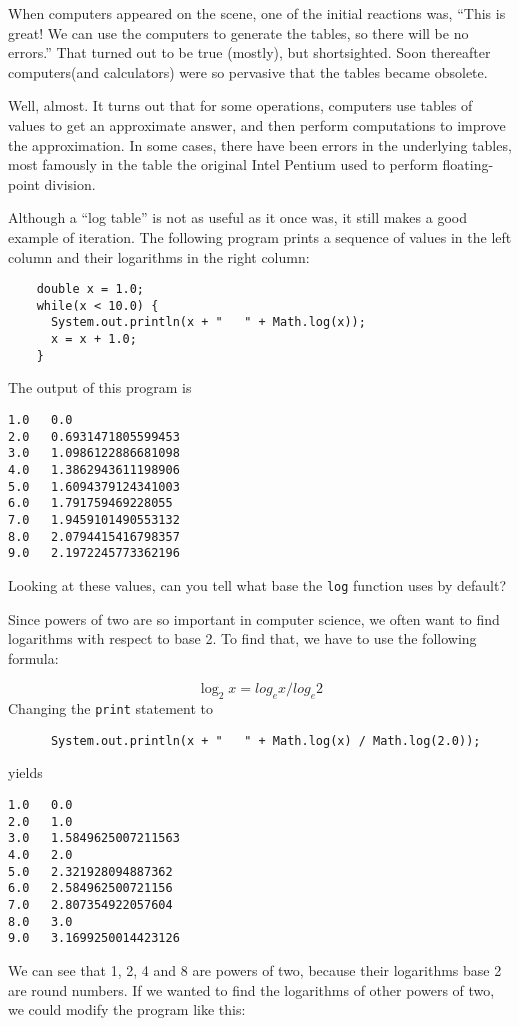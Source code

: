\documentclass{book}
\begin{document}
When computers appeared on the scene, one of the initial reactions
was, ``This is great!  We can use the computers to generate the
tables, so there will be no errors.''  That turned out to be true
(mostly), but shortsighted.  Soon thereafter computers(and
calculators) were so pervasive that the tables became obsolete.

Well, almost.  It turns out that for some operations, computers
use tables of values to get an approximate answer, and then
perform computations to improve the approximation.  In some
cases, there have been errors in the underlying tables, most
famously in the table the original Intel Pentium used to perform
floating-point division.


Although a ``log table'' is not as useful as it once was, it still
makes a good example of iteration.  The following program prints a
sequence of values in the left column and their logarithms in the
right column:

\begin{verbatim}
    double x = 1.0;
    while(x < 10.0) {
      System.out.println(x + "   " + Math.log(x));
      x = x + 1.0;
    }
\end{verbatim}
%
The output of this program is

\begin{verbatim}
1.0   0.0
2.0   0.6931471805599453
3.0   1.0986122886681098
4.0   1.3862943611198906
5.0   1.6094379124341003
6.0   1.791759469228055
7.0   1.9459101490553132
8.0   2.0794415416798357
9.0   2.1972245773362196
\end{verbatim}
%
Looking at these values, can you tell what base the {\tt log}
function uses by default?

Since powers of two are so important
in computer science, we often want to find logarithms with
respect to base 2.  To find that, we have to use the following
formula:

\begin{equation}
\log_2 x = log_e x / log_e 2
\end{equation}
%
Changing the {\tt print} statement to

\begin{verbatim}
      System.out.println(x + "   " + Math.log(x) / Math.log(2.0));
\end{verbatim}
%
yields

\begin{verbatim}
1.0   0.0
2.0   1.0
3.0   1.5849625007211563
4.0   2.0
5.0   2.321928094887362
6.0   2.584962500721156
7.0   2.807354922057604
8.0   3.0
9.0   3.1699250014423126
\end{verbatim}
%
We can see that 1, 2, 4 and 8 are powers of two, because
their logarithms base 2 are round numbers.  If we wanted to find
the logarithms of other powers of two, we could modify the
program like this:
\end{document}
